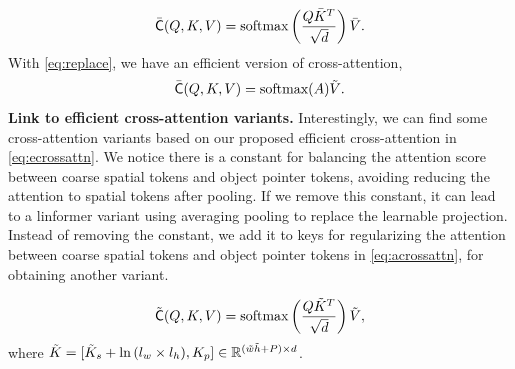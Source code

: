 \begin{equation}\label{eq:scrossattn}
     \Bar{\textsf{C}}(Q, K, V) =  \text{softmax}\left(\frac{Q\bar{K}^T}{\sqrt{d}}\right) \bar{V}.
\end{equation}
With \cref{eq:replace}, we have an efficient version of cross-attention, 
\begin{equation}\label{eq:ecrossattn}
     \Bar{\textsf{C}}(Q, K, V) = \text{softmax}(A)\Tilde{V}.
\end{equation}
\noindent\textbf{Link to efficient cross-attention variants.} Interestingly, we can find some cross-attention variants based on our proposed efficient cross-attention in  \cref{eq:ecrossattn}. We notice there is a constant for balancing the attention score between coarse spatial tokens and object pointer tokens, avoiding reducing the attention to spatial tokens after pooling. If we remove this constant, it can lead to a linformer variant using averaging pooling to replace the learnable projection. Instead of removing the constant, we add it to keys for regularizing the attention between coarse spatial tokens and object pointer tokens in \cref{eq:acrossattn}, for obtaining another variant. 

\begin{equation}\label{eq:acrossattn}
     \Tilde{\textsf{C}}(Q, K, V) = \text{softmax}\left(\frac{Q\Tilde{K}^{T}}{\sqrt{d}} \right)\Tilde{V},
\end{equation}
where $\Tilde{K} = [\Tilde{K}_s + \ln{(l_w\times l_h)}, K_p]\in\mathbb{R}^{(\Tilde{w}\Tilde{h}+P)\times d}$.

